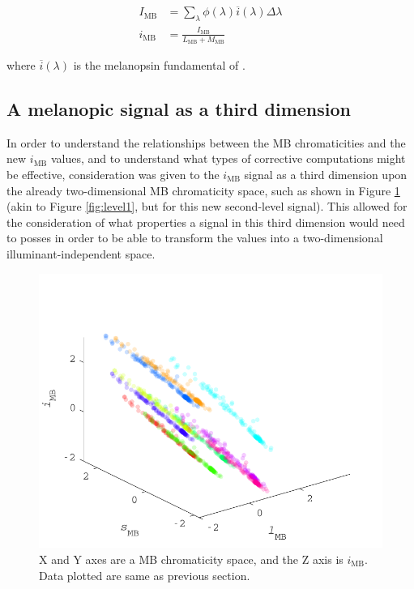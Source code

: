 \begin{subequations}
\begin{align}
I_{\text{MB}}&=\sum_{\lambda} \phi(\lambda) \overline{i}(\lambda) \Delta \lambda \\
i_{\text{MB}}&= \frac{I_{\text{MB}}}{L_{\text{MB}}+M_{\text{MB}}} 
\end{align}
\label{eq:iMB}
\end{subequations}

where $\overline{i}(\lambda)$ is the melanopsin fundamental of \citet{lucas_measuring_2014}.


\subsection{A melanopic signal as a third dimension}

In order to understand the relationships between the \gls{MB} chromaticities and the new $i_{\text{MB}}$ values, and to understand what types of corrective computations might be effective, consideration was given to the $i_{\text{MB}}$ signal as a third dimension upon the already two-dimensional \gls{MB} chromaticity space, such as shown in Figure \ref{fig:ZL} (akin to Figure \ref{fig:level1}, but for this new second-level signal). This allowed for the consideration of what properties a signal in this third dimension would need to posses in order to be able to transform the values into a two-dimensional illuminant-independent space.

\begin{figure}[htbp]
 \includegraphics[max width=\textwidth]{figs/comp/thirdDimension/ZL.pdf}
 \caption{X and Y axes are a \gls{MB} chromaticity space, and the Z axis is $i_{\text{MB}}$. Data plotted are same as previous section.}
 \label{fig:ZL}
\end{figure}

